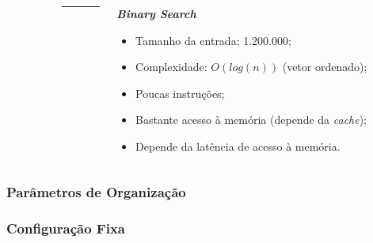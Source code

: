 \documentclass{beamer}
\begin{document}
\begin{frame}
\begin{columns}
\begin{column}{0.33\textwidth}
            \end{column}

            \begin{column}{0.01\textwidth}
                \rule{.1mm}{0.75\textheight}
            \end{column}

            \begin{column}{0.33\textwidth}

                \begin{center}
                    \textbf{\textit{Binary Search}}
                \end{center}

                \begin{itemize}
                    \footnotesize
                    \item Tamanho da entrada: 1.200.000;
                    \item Complexidade: $O(log(n))$ (vetor ordenado);
                    \item Poucas instruções;
                    \item Bastante acesso à memória (depende da \textit{cache});
                    \item Depende da latência de acesso à memória.
                \end{itemize}

            \end{column}
        \end{columns}
    \end{frame}

    \begin{frame}
        \frametitle{Parâmetros de Organização}

        \begin{figure}[h]
        \centering
        \end{figure}

    \end{frame}

    \begin{frame}
        \frametitle{Configuração Fixa}

        \begin{figure}[h]
            \centering
        \end{figure}

    \end{frame}
\end{document}
